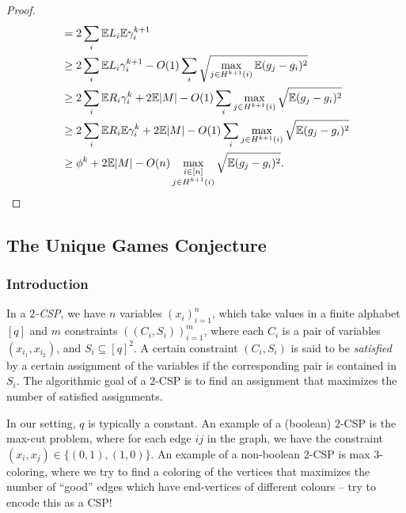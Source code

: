 \begin{proof}
\begin{align*}
				&= 2 \sum_i \mathbb{E} L_i \mathbb{E} \gamma_i^{k+1} \\
				&\ge 2 \sum_i \mathbb{E} L_i \gamma_i^{k+1} - O(1) \sum_i \sqrt{\max_{j \in H^{k+1}(i)} \mathbb{E} (g_j - g_i)^2} \\
				&\ge 2 \sum_i \mathbb{E} R_i \gamma_i^k + 2 \mathbb{E} |M| - O(1) \sum_i \max_{j \in H^{k+1}(i)} \sqrt{\mathbb{E} (g_j - g_i)^2} \\
				&\ge 2 \sum_i \mathbb{E} R_i \mathbb{E} \gamma_i^k + 2 \mathbb{E} |M| - O(1) \sum_i \max_{j \in H^{k+1}(i)} \sqrt{ \mathbb{E} (g_j - g_i)^2} \\
				&\ge \phi^{k} + 2 \mathbb{E} |M| - O(n) \max_{\substack{i \in [n] \\ j \in H^{k+1}(i)}} \sqrt{\mathbb{E} (g_j - g_i)^2}. \qedhere
		\end{align*}
	\end{proof}

\subsection{The Unique Games Conjecture}
\label{subsec:ugc}

	\subsubsection{Introduction}

		\begin{fdef}
			In a \emph{$2$-CSP}, we have $n$ variables $(x_i)_{i=1}^n$, which take values in a finite alphabet $[q]$ and $m$ constraints $( (C_i,S_i) )_{i=1}^m$, where each $C_i$ is a pair of variables $(x_{i_1},x_{i_2})$, and $S_i \subseteq [q]^2$. A certain constraint $(C_i,S_i)$ is said to be \emph{satisfied} by a certain assignment of the variables if the corresponding pair is contained in $S_i$. The algorithmic goal of a $2$-CSP is to find an assignment that maximizes the number of satisfied assignments.
		\end{fdef}
		In our setting, $q$ is typically a constant. An example of a (boolean) $2$-CSP is the max-cut problem, where for each edge $ij$ in the graph, we have the constraint $(x_i,x_j) \in \{(0,1),(1,0)\}$. An example of a non-boolean $2$-CSP is max $3$-coloring, where we try to find a coloring of the vertices that maximizes the number of ``good'' edges which have end-vertices of different colours -- try to encode this as a CSP!

